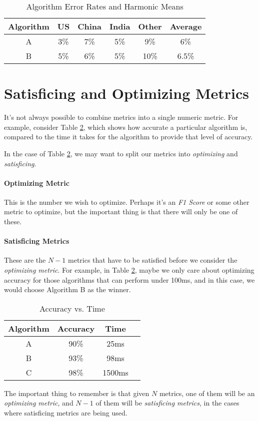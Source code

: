 \documentclass{article}
\begin{document}
\begin{table}[ht]
\begin{center}
\begin{tabular}[h]{c | c | c | c | c | c}
Algorithm & US & China & India & Other & Average \\ \hline
A & 3\% & 7\% & 5\% & 9\% & 6\% \\
B & 5\% & 6\% & 5\% & 10\% & 6.5\%
\end{tabular}
\caption{Algorithm Error Rates and Harmonic Means} \label{tbl:error_rates}
\end{center}
\end{table}

\section{Satisficing and Optimizing Metrics}

It's not always possible to combine metrics into a single numeric metric.  For example, consider Table \ref{tbl:accuracy_vs_time}, which shows how accurate a particular algorithm is, compared to the time it takes for the algorithm to provide that level of accuracy.

In the case of Table \ref{tbl:accuracy_vs_time}, we may want to split our metrics into \textit{optimizing} and \textit{satisficing}.

\paragraph{Optimizing Metric}

This is the number we wish to optimize.  Perhaps it's an \textit{F1 Score} or some other metric to optimize, but the important thing is that there will only be one of these.

\paragraph{Satisficing Metrics}

These are the $N-1$ metrics that have to be satisfied before we consider the \textit{optimizing metric}.  For example, in Table \ref{tbl:accuracy_vs_time}, maybe we only care about optimizing accuracy for those algorithms that can perform under 100ms, and in this case, we would choose Algorithm B as the winner.

\begin{table}[ht]
\begin{center}
\begin{tabular}[h]{c | c | c | c}
Algorithm & Accuracy & Time \\ \hline
A & 90\% & 25ms \\
B & 93\% & 98ms \\
C & 98\% & 1500ms
\end{tabular}
\caption{Accuracy vs. Time} \label{tbl:accuracy_vs_time}
\end{center}
\end{table}

The important thing to remember is that given $N$ metrics, one of them will be an \textit{optimizing metric}, and $N-1$ of them will be \textit{satisficing metrics}, in the cases where satisficing metrics are being used.
\end{document}
